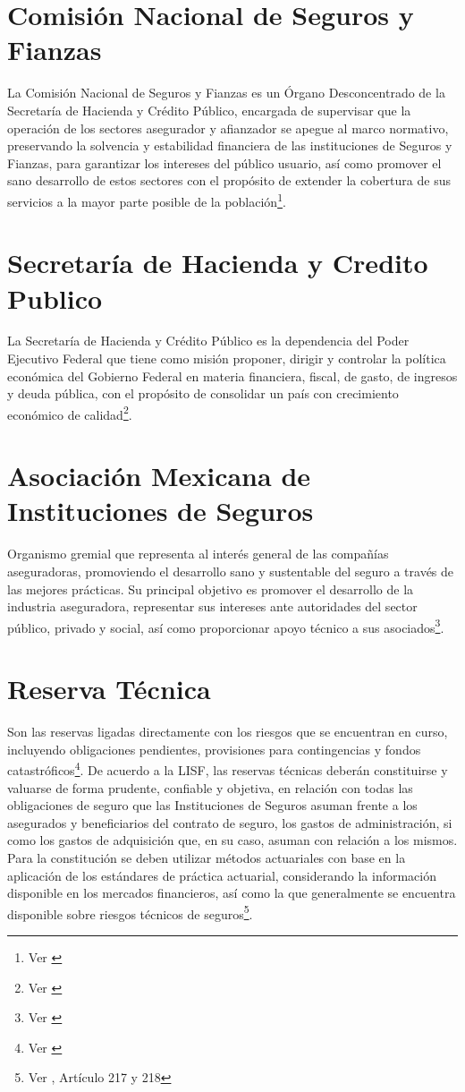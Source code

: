 \documentclass[11pt,twoside,openright,spanish]{report}
\numberwithin{equation}{chapter}
\numberwithin{figure}{chapter}
\numberwithin{table}{chapter}
\begin{document}
		\section{Comisión Nacional de Seguros y Fianzas}
	
	La Comisión Nacional de Seguros y Fianzas es un Órgano Desconcentrado de la Secretaría de Hacienda y Crédito Público, encargada de supervisar que la operación de los sectores asegurador y afianzador se apegue al marco normativo, preservando la solvencia y estabilidad financiera de las instituciones de Seguros y Fianzas, para garantizar los intereses del público usuario, así como promover el sano desarrollo de estos sectores con el propósito de extender la cobertura de sus servicios a la mayor parte posible de la población\footnote{Ver \citet{EComision}}. 
	
	\section{Secretaría de Hacienda y Credito Publico}
	
	La Secretaría de Hacienda y Crédito Público es la dependencia del Poder Ejecutivo Federal que tiene como misión proponer, dirigir y controlar la política económica del Gobierno Federal en materia financiera, fiscal, de gasto, de ingresos y deuda pública, con el propósito de consolidar un país con crecimiento económico de calidad\footnote{Ver \citet{NSHCP}}.
	
	
	\section{Asociación Mexicana de Instituciones de Seguros}
	
	Organismo gremial que representa al interés general de las compañías aseguradoras, promoviendo el desarrollo sano y sustentable del seguro a través de las mejores prácticas. Su principal objetivo es promover el desarrollo de la industria aseguradora, representar sus  intereses ante autoridades del sector público, privado y social, así como proporcionar apoyo técnico a sus asociados\footnote{Ver \citet{FAmis}}. 
	
	\section{Reserva Técnica}
Son las reservas ligadas directamente con los riesgos que se encuentran en curso, incluyendo obligaciones pendientes, provisiones para contingencias y fondos catastróficos\footnote{Ver \citet{RResAssal}}.
De acuerdo a la LISF, las reservas técnicas deberán constituirse y valuarse de forma prudente, confiable y objetiva, en relación con todas las obligaciones de seguro que las Instituciones de Seguros asuman frente a los asegurados y beneficiarios del contrato de seguro, los gastos de administración, si como los gastos de adquisición que, en su caso, asuman con relación a los mismos. Para la constitución se deben utilizar métodos actuariales con base en la aplicación de los estándares de práctica actuarial, considerando la información disponible en los mercados financieros, así como la que generalmente se encuentra disponible sobre riesgos técnicos de seguros\footnote{Ver \citet{DReservasTec}, Artículo 217 y 218}. 
\end{document}
